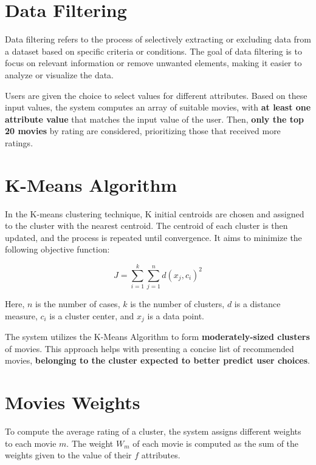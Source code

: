 \documentclass{Configuration_Files/Template}
\begin{document}
\section{Data Filtering}

Data filtering refers to the process of selectively extracting or excluding data from a dataset based on specific criteria or conditions. The goal of data filtering is to focus on relevant information or remove unwanted elements, making it easier to analyze or visualize the data.

Users are given the choice to select values for different attributes. Based on these input values, the system computes an array of suitable movies, with \textbf{at least one attribute value} that matches the input value of the user. Then, \textbf{only the top 20 movies} by rating are considered, prioritizing those that received more ratings.

\section{K-Means Algorithm}

In the K-means clustering technique, K initial centroids are chosen and assigned to the cluster with the nearest centroid. The centroid of each cluster is then updated, and the process is repeated until convergence. It aims to minimize the following objective function:

\begin{equation}
    J = \sum_{i=1}^{k} \sum_{j=1}^{n} d(x_j, c_i)^2
\end{equation}

Here, \(n\) is the number of cases, \(k\) is the number of clusters, \(d\) is a distance measure, \(c_i\) is a cluster center, and \(x_j\) is a data point.

The system utilizes the K-Means Algorithm to form \textbf{moderately-sized clusters} of movies. This approach helps with presenting a concise list of recommended movies, \textbf{belonging to the cluster expected to better predict user choices}.

\section{Movies Weights}

To compute the average rating of a cluster, the system assigns different weights to each movie \(m\). The weight \(W_m\) of each movie is computed as the sum of the weights given to the value of their \(f\) attributes.
\end{document}
